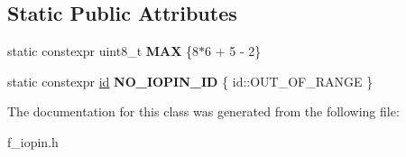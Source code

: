\subsection*{Static Public Attributes}
\begin{DoxyCompactItemize}
\item 
\mbox{\label{classfsl_1_1hw_1_1gpio__pin_a58b00ddf8b758384ea0907cf8162cf43}} 
static constexpr uint8\+\_\+t {\bfseries M\+AX} \{8$\ast$6 + 5 -\/ 2\}
\item 
\mbox{\label{classfsl_1_1hw_1_1gpio__pin_a9517fd07abf0d281000154bc65edaa06}} 
static constexpr \mbox{\hyperlink{classfsl_1_1lg_1_1range__int}{id}} {\bfseries N\+O\+\_\+\+I\+O\+P\+I\+N\+\_\+\+ID} \{ id\+::\+O\+U\+T\+\_\+\+O\+F\+\_\+\+R\+A\+N\+GE \}
\end{DoxyCompactItemize}


The documentation for this class was generated from the following file\+:\begin{DoxyCompactItemize}
\item 
f\+\_\+iopin.\+h\end{DoxyCompactItemize}
